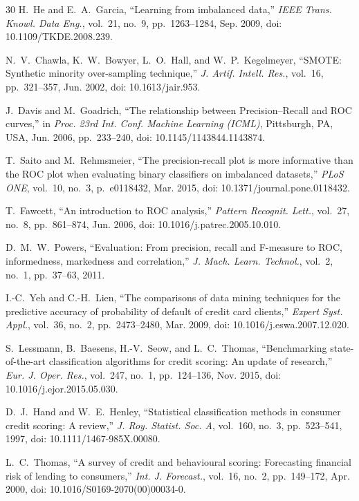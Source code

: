 \documentclass[journal]{IEEEtran}
\begin{document}
\begin{thebibliography}{30}
H.~He and E.~A.~Garcia, ``Learning from imbalanced data,'' \emph{IEEE Trans. Knowl. Data Eng.}, vol.~21, no.~9, pp.~1263--1284, Sep. 2009, doi: 10.1109/TKDE.2008.239.

N.~V.~Chawla, K.~W.~Bowyer, L.~O.~Hall, and W.~P.~Kegelmeyer, ``SMOTE: Synthetic minority over-sampling technique,'' \emph{J. Artif. Intell. Res.}, vol.~16, pp.~321--357, Jun. 2002, doi: 10.1613/jair.953.

J.~Davis and M.~Goadrich, ``The relationship between Precision--Recall and ROC curves,'' in \emph{Proc. 23rd Int. Conf. Machine Learning (ICML)}, Pittsburgh, PA, USA, Jun. 2006, pp.~233--240, doi: 10.1145/1143844.1143874.

T.~Saito and M.~Rehmsmeier, ``The precision-recall plot is more informative than the ROC plot when evaluating binary classifiers on imbalanced datasets,'' \emph{PLoS ONE}, vol.~10, no.~3, p.~e0118432, Mar. 2015, doi: 10.1371/journal.pone.0118432.

T.~Fawcett, ``An introduction to ROC analysis,'' \emph{Pattern Recognit. Lett.}, vol.~27, no.~8, pp.~861--874, Jun. 2006, doi: 10.1016/j.patrec.2005.10.010.

D.~M.~W.~Powers, ``Evaluation: From precision, recall and F-measure to ROC, informedness, markedness and correlation,'' \emph{J. Mach. Learn. Technol.}, vol.~2, no.~1, pp.~37--63, 2011.

I.-C.~Yeh and C.-H.~Lien, ``The comparisons of data mining techniques for the predictive accuracy of probability of default of credit card clients,'' \emph{Expert Syst. Appl.}, vol.~36, no.~2, pp.~2473--2480, Mar. 2009, doi: 10.1016/j.eswa.2007.12.020.

S.~Lessmann, B.~Baesens, H.-V.~Seow, and L.~C.~Thomas, ``Benchmarking state-of-the-art classification algorithms for credit scoring: An update of research,'' \emph{Eur. J. Oper. Res.}, vol.~247, no.~1, pp.~124--136, Nov. 2015, doi: 10.1016/j.ejor.2015.05.030.

D.~J.~Hand and W.~E.~Henley, ``Statistical classification methods in consumer credit scoring: A review,'' \emph{J. Roy. Statist. Soc. A}, vol.~160, no.~3, pp.~523--541, 1997, doi: 10.1111/1467-985X.00080.

L.~C.~Thomas, ``A survey of credit and behavioural scoring: Forecasting financial risk of lending to consumers,'' \emph{Int. J. Forecast.}, vol.~16, no.~2, pp.~149--172, Apr. 2000, doi: 10.1016/S0169-2070(00)00034-0.


\end{thebibliography}
\end{document}

